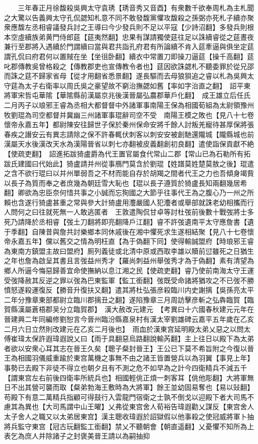 　　三年春正月徐馥殺吳興太守袁琇【琇音秀又音酉】有衆數千欲奉周札為主札聞之大驚以告義興太守孔侃勰知札意不同不敢發馥黨懼攻馥殺之孫弼亦死札子續亦聚衆應馥左丞相睿議發兵討之王導曰今少發兵則不足以平寇【少詩沼翻】多發兵則根本空虛續族弟黄門侍郎莚【莚夷然翻】忠果有謀請獨使莚往足以誅續睿從之莚晝夜兼行至郡將入遇續於門謂續曰當與君共詣孔府君有所論續不肯入莚牽逼與俱坐定莚謂孔侃曰府君何以置賊在坐【坐徂卧翻】續衣中常置刀即操刀逼莚【操千高翻】莚叱郡傳教吳曾格殺之【傳教郡吏也宣傳教令者也】莚因欲誅勰札不聽委罪於從兄邵而誅之莚不歸家省母【從才用翻省悉景翻】遂長驅而去母狼狽追之睿以札為吳興太守莚為太子右衛率以周氏吳之豪望故不窮治撫勰如舊【率如字治直之翻】　詔平東將軍宋哲屯華隂【華隂縣前漢屬京兆後漢晉屬弘農郡華戶化翻】　成王雄立后任氏　二月丙子以琅邪王睿為丞相大都督督中外諸軍事南陽王保為相國荀組為太尉領豫州牧劉琨為司空都督并冀幽三州諸軍事琨辭司空不受　南陽王模之敗也【見八十七卷懷帝永嘉五年】都尉陳安往歸世子保於秦州保命安將千餘人討叛羌寵待甚厚保將張春疾之譖安云有異志請除之保不許春輒伏刺客以刺安安被創馳還隴城【隴縣城也前漢屬天水後漢改天水為漢陽晉省以刺七亦翻被皮義翻創初良翻】遣使詣保貢獻不絶【使疏吏翻】　詔進拓跋猗盧爵為代王置官屬食代常山二郡【常山已為石勒所有拓跋氏建國曰代始此】猗盧請并州從事鴈門莫含於劉琨【姓譜莫姓楚莫敖之後】琨遣之含不欲行琨曰以并州單弱吾之不材而能自存於胡羯之間者代王之力也吾傾身竭貲以長子為質而奉之者庶幾為朝廷雪大恥也【琨以長子遵質於猗盧長知兩翻幾居希翻】卿欲為忠臣奈何惜共事之小誠而忘狥國之大節乎往事代王為之腹心乃一州之所賴也含遂行猗盧甚重之常與參大計猗盧用灋嚴國人犯灋者或舉部就誅老幼相攜而行人問何之曰往就死無一人敢逃匿者　王敦遣陶侃甘卓等討杜弢前後數十戰弢將士多死乃請降於丞相睿【弢土刀翻將即亮翻降戶江翻】睿不許弢遺南平太守應詹書【遺于季翻】自陳昔與詹共討樂鄉本同休戚後在湘中懼死求生遂相結聚【見八十七卷懷帝永嘉五年】儻以舊交之情為明枉直【為于偽翻下同】使得輸誠盟府【時琅邪王睿為東南方鎮盟主故曰盟府】厠列義徒或北清中原或西取李雄以贖前愆雖死之日猶生之年也詹為啟呈其書且言弢益州秀才【羅尚刺益州舉弢秀才為于偽翻】素有清望為鄉人所逼今悔惡歸善宜命使撫納以息江湘之民【使疏吏翻】睿乃使前南海太守王運受弢降赦其反逆之罪以弢為巴東監軍【監工銜翻】弢既受命諸將猶攻之不已弢不勝憤怒遂殺運復反【勝音升復扶又翻】遣其將杜弘張彦殺臨川内史謝摛【吳孫亮太平二年分豫章東部都尉立臨川郡摛丑之翻】遂陷豫章三月周訪擊彦斬之弘犇臨賀【臨賀縣漢屬蒼梧郡吴分立臨賀郡】　漢大赦改元建元　【考異曰十六國春秋建元元年在晉建興二年同編修劉恕言今晉州臨汾縣嘉泉村有漢太宰劉雄碑云嘉平五年歲在乙亥二月六日立然則改建元在乙亥二月後也】　雨血於漢東宫延明殿太弟乂惡之以問太傅崔瑋太保許遐瑋遐說乂曰【雨于具翻惡烏路翻說輸芮翻】主上往日以殿下為太弟者欲以安衆心耳其志在晉王久矣【聰子粲封晉王】王公已下莫不希旨附之今復以晉王為相國羽儀威重踰於東宫萬機之事無不由之諸王皆置營兵以為羽翼【事見上年】事勢已去殿下非徒不得立也朝夕且有不測之危不如早為之計今四衛精兵不減五千【謂東宫左右前後四衛率所統兵也】相國輕佻正煩一刺客耳【佻他彫翻】大將軍無日不出其營可襲而取【粲弟勃海王敷時為大將軍】餘王並幼固易奪也【易以䜴翻】苟殿下有意二萬精兵指顧可得鼓行入雲龍門宿衛之士孰不倒戈以迎殿下者大司馬不慮其為異也【大司馬謂中山王曜】乂弗從東宫舍人荀裕告瑋遐勸乂謀反【東宫舍人太子舍人之職又以太弟居東宫】漢主聰收瑋遐於詔獄假以他事殺之使冠威將軍卜抽將兵監守東宫【冠古玩翻監工銜翻】禁乂不聽朝會【朝直遥翻】乂憂懼不知所為上表乞為庶人并除諸子之封褒美晉王請以為嗣抽抑